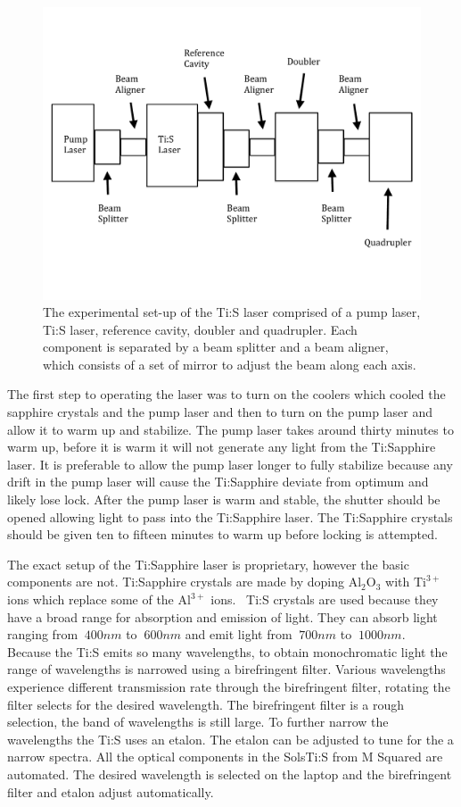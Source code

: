 \documentclass[prb,preprint]{revtex4-1}
\begin{document}
\begin{figure}[h!]
\centering
\includegraphics[width=6in]{LaserSetup.pdf}
\caption{The experimental set-up of the Ti:S laser comprised of a pump laser, Ti:S laser, reference cavity, doubler and quadrupler. Each component is separated by a beam splitter and a beam aligner, which consists of a set of mirror to adjust the beam along each axis.}
\label{LaserSetup}
\end{figure}

The first step to operating the laser was to turn on the coolers which cooled the sapphire crystals and the pump laser and then to turn on the pump laser and allow it to warm up and stabilize. The pump laser takes around thirty minutes to warm up, before it is warm it will not generate any light from the Ti:Sapphire laser. It is preferable to allow the pump laser longer to fully stabilize because any drift in the pump laser will cause the Ti:Sapphire deviate from optimum and likely lose lock. After the pump laser is warm and stable, the shutter should be opened allowing light to pass into the Ti:Sapphire laser. The Ti:Sapphire crystals should be given ten to fifteen minutes to warm up before locking is attempted.

The exact setup of the Ti:Sapphire laser is proprietary, however the basic components are not. Ti:Sapphire crystals are made by doping $\text{Al}_2\text{O}_3$ with $\text{Ti}^{3+}$ ions which replace some of the $\text{Al}^{3+}$ ions.~\cite{Ti:S} Ti:S crystals are used because they have a broad range for absorption and emission of light. They can absorb light ranging from $~400 nm$ to $~600 nm$ and emit light from $~700 nm$ to $~1000 nm$.~\cite{Ti:S} Because the Ti:S emits so many wavelengths, to obtain monochromatic light the range of wavelengths is narrowed using a birefringent filter. Various wavelengths experience different transmission rate through the birefringent filter, rotating the filter selects for the desired wavelength. The birefringent filter is a rough selection, the band of wavelengths is still large. To further narrow the wavelengths the Ti:S uses an etalon. The etalon can be adjusted to tune for the a narrow spectra. All the optical components in the SolsTi:S from M Squared are automated. The desired wavelength is selected on the laptop and the birefringent filter and etalon adjust automatically.
\end{document}
